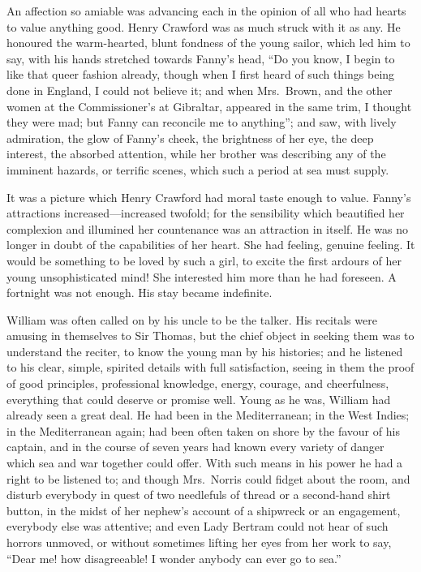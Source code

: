An affection so amiable was advancing each in the opinion
of all who had hearts to value anything good.  Henry Crawford
was as much struck with it as any.  He honoured the
warm-hearted, blunt fondness of the young sailor, which led
him to say, with his hands stretched towards Fanny's head,
``Do you know, I begin to like that queer fashion already,
though when I first heard of such things being done
in England, I could not believe it; and when Mrs.\ Brown,
and the other women at the Commissioner's at Gibraltar,
appeared in the same trim, I thought they were mad; but Fanny
can reconcile me to anything''; and saw, with lively admiration,
the glow of Fanny's cheek, the brightness of her eye,
the deep interest, the absorbed attention, while her
brother was describing any of the imminent hazards,
or terrific scenes, which such a period at sea must supply.

It was a picture which Henry Crawford had moral taste enough
to value.  Fanny's attractions increased---increased twofold;
for the sensibility which beautified her complexion and
illumined her countenance was an attraction in itself.
He was no longer in doubt of the capabilities of her heart.
She had feeling, genuine feeling.  It would be something
to be loved by such a girl, to excite the first ardours
of her young unsophisticated mind!  She interested him
more than he had foreseen.  A fortnight was not enough.
His stay became indefinite.

William was often called on by his uncle to be the talker.
His recitals were amusing in themselves to Sir Thomas,
but the chief object in seeking them was to understand
the reciter, to know the young man by his histories;
and he listened to his clear, simple, spirited details with
full satisfaction, seeing in them the proof of good principles,
professional knowledge, energy, courage, and cheerfulness,
everything that could deserve or promise well.
Young as he was, William had already seen a great deal.
He had been in the Mediterranean; in the West Indies;
in the Mediterranean again; had been often taken on shore
by the favour of his captain, and in the course of seven
years had known every variety of danger which sea and war
together could offer.  With such means in his power he
had a right to be listened to; and though Mrs.\ Norris could
fidget about the room, and disturb everybody in quest
of two needlefuls of thread or a second-hand shirt button,
in the midst of her nephew's account of a shipwreck
or an engagement, everybody else was attentive; and even
Lady Bertram could not hear of such horrors unmoved,
or without sometimes lifting her eyes from her work to say,
``Dear me! how disagreeable!  I wonder anybody can ever go
to sea.''

